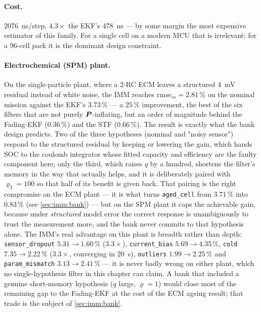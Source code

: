 \paragraph{Cost.}  \SI{2076}{\nano\second}/step, $4.3\times$ the EKF's \SI{478}{\nano\second} --- by
some margin the most expensive estimator of this family.  For a single cell on a modern MCU that is
irrelevant; for a 96-cell pack it is the dominant design constraint.

\paragraph{Electrochemical (SPM) plant.}  On the single-particle plant, where a 2-RC ECM leaves a
structured \SI{4}{\milli\volt} residual instead of white noise, the IMM reaches
$\mathrm{rmse}_{ss}=2.81\,\%$ on the nominal mission against the EKF's $3.73\,\%$ --- a $25\,\%$
improvement, the best of the six filters that are not purely $\bm{P}$-inflating, but an order of
magnitude behind the Fading-EKF ($0.36\,\%$) and the STF ($0.66\,\%$).  The result is exactly what the
bank design predicts.  Two of the three hypotheses (nominal and "noisy sensor") respond to the
structured residual by keeping or lowering the gain, which hands SOC to the coulomb integrator whose
fitted capacity and efficiency are the faulty component here; only the third, which raises $q$ by a
hundred, shortens the filter's memory in the way that actually helps, and it is deliberately paired
with $\varrho_3=100$ so that half of its benefit is given back.  That pairing is the right compromise
on the ECM plant --- it is what turns \texttt{aged\_cell} from $3.71\,\%$ into $0.83\,\%$ (see
\cref{sec:imm:bank}) --- but on the SPM plant it caps the achievable gain, because under
\emph{structured} model error the correct response is unambiguously to trust the measurement more, and
the bank never commits to that hypothesis alone.  The IMM's real advantage on this plant is breadth
rather than depth: \texttt{sensor\_dropout} $5.31\to1.60\,\%$ ($3.3\times$), \texttt{current\_bias}
$5.69\to4.35\,\%$, \texttt{cold} $7.35\to2.22\,\%$ ($3.3\times$, converging in \SI{20}{\second}),
\texttt{outliers} $1.99\to2.25\,\%$ and \texttt{param\_mismatch} $3.13\to2.41\,\%$ --- it is never
badly wrong on either plant, which no single-hypothesis filter in this chapter can claim.  A bank that
included a genuine short-memory hypothesis ($q$ large, $\varrho=1$) would close most of the remaining
gap to the Fading-EKF at the cost of the ECM ageing result; that trade is the subject of
\cref{sec:imm:bank}.

